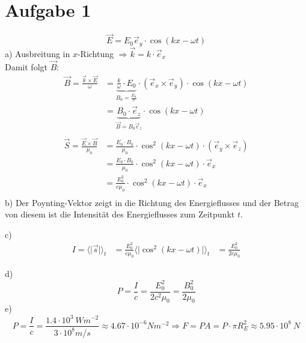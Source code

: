 \documentclass[11pt a4paper]{article}
\begin{document}
\thispagestyle{fancy}

\section*{Aufgabe 1}
\[ \vec E = E_0 \vec e_y \cdot \cos(kx - \omega t) \]
a) Ausbreitung in $x$-Richtung $\Rightarrow \vec k = k \cdot \vec e_x $ \\
Damit folgt $\vec B$:
\begin{align*}
	\vec B = \frac{\vec k \times \vec E}{\omega} 
	&= \underbrace{\frac{k}{\omega} \cdot E_0}_{B_0 = \frac{E_0}{c}}
		\cdot (\vec e_x \times \vec e_y) \cdot \cos(kx - \omega t) \\
	&= \underbrace{B_0 \cdot \vec e_z}_{\vec B = B_0 \vec e_z} \cdot \cos(kx - \omega t) \\
\end{align*}
\begin{align*}
	\vec S = \frac{\vec E \times \vec B}{\mu_0}
	&= \frac{E_0 \cdot B_0}{\mu_0} \cdot \cos^2(kx - \omega t) \cdot (\vec e_y \times \vec e_z) \\
	&= \frac{E_0 \cdot B_0}{\mu_0} \cdot \cos^2(kx - \omega t) \cdot \vec e_x \\
	&= \frac{E_0^2}{c \mu_0} \cdot \cos^2(kx - \omega t) \cdot \vec e_x \\
\end{align*}
b) Der Poynting-Vektor zeigt in die Richtung des Energieflusses und der Betrag von diesem ist die Intensität des 
Energieflusses zum Zeitpunkt $t$.

\vspace{0.5cm}
\noindent 
c)
\begin{align*}
	I = \langle \vert \vec s \vert \rangle_t 
	&= \frac{E_0^2}{c\mu_0} \langle \vert \cos^2(kx - \omega t) \vert \rangle_t
	&= \frac{E_0^2}{2c\mu_0}
\end{align*}

\vspace{0.5cm}
\noindent 
d)
\[ P = \frac{I}{c} = \frac{E_0^2}{2c^2\mu_0} = \frac{B_0^2}{2\mu_0} \]
e) 
\[ P = \frac{I}{c} = \frac{1.4 \cdot 10^3 \ Wm^{-2}}{3 \cdot 10^8 m/s} \approx 4.67 \cdot 10^{-6} Nm^{-2} 
\Rightarrow 
F = PA = P \cdot \pi R_E^2 \approx 5.95 \cdot 10^{8} \ N 
\]

\newpage
\setlength{\headheight}{0cm}
\end{document}
